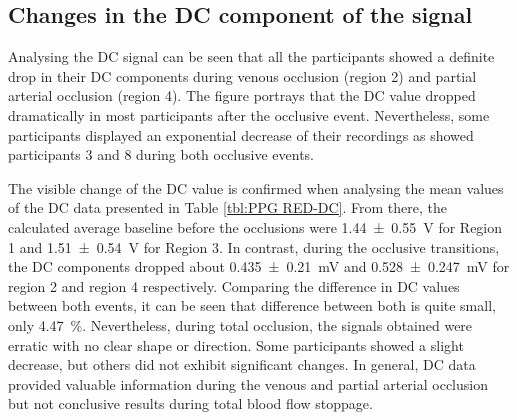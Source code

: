 \subsection{Changes in the DC component of the signal}
\label{section comparison 4.1}
Analysing the DC signal can be seen that all the participants showed a definite drop in their DC components during venous occlusion (region 2) and partial arterial occlusion (region 4). The figure portrays that the DC value dropped dramatically in most participants after the occlusive event. Nevertheless, some participants displayed an exponential decrease of their recordings as showed participants 3 and 8 during both occlusive events. 

The visible change of the DC value is confirmed when analysing the mean values of the DC data presented in Table \ref{tbl:PPG RED-DC}. From there, the calculated average baseline before the occlusions were \SI{1.44(055)}{\volt} for Region 1 and \SI{1.51(054)}{\volt} for Region 3.  In contrast, during the occlusive transitions, the DC components dropped about \SI{0.435(0210)}{\milli\volt} and \SI{0.528(0247)}{\milli\volt} for region 2 and region 4 respectively. Comparing the difference in DC values between both events, it can be seen that difference between both is quite small, only \SI{4.47}{\percent}. Nevertheless, during total occlusion, the signals obtained were erratic with no clear shape or direction. Some participants showed a slight decrease, but others did not exhibit significant changes. In general, DC data provided valuable information during the venous and partial arterial occlusion but not conclusive results during total blood flow stoppage. 

